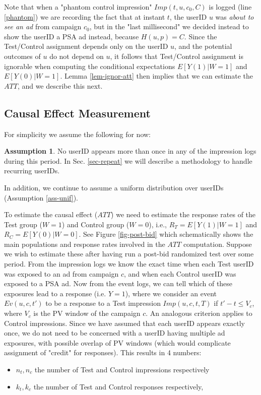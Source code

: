 \documentclass[11pt,a4paper]{article}
\theoremstyle{definition}
\theoremstyle{remark}
\theoremstyle{definition}
\theoremstyle{definition}
\theoremstyle{definition}
\theoremstyle{definition}
\theoremstyle{definition}
\theoremstyle{definition}
\newtheorem{assumption}{Assumption
}[section]
\begin{document}
Note that when a "phantom control impression" $Imp(t, u, c_0, C)$ is logged (line \ref{phantom}) we are recording the fact that at instant $t$, the userID $u$ was {\em about to see an ad} from campaign $c_0$, but in the "last millisecond" we decided instead to show the userID a PSA ad instead, because $H(u,p) = C$. Since the Test/Control assignment depends only on the userID $u$, and the potential outcomes of $u$ do not depend on $u$, it follows that Test/Control assignment is ignorable when computing the conditional expectations $E[Y(1) | W=1]$ and $E[Y(0) | W=1]$. Lemma \ref{lem-ignor-att} then implies that we can estimate the $ATT$, and we describe this next.

\subsection{Causal Effect Measurement}\label{sub-causal-post-bid}

For simplicity we assume the following for now:
\begin{assumption}\small \label{assum-user-once}
	No userID appears more than once in any of the impression logs during this period. In Sec. \ref{sec-repeat} we will describe a methodology to handle recurring userIDs.
\end{assumption}

In addition, we continue to assume a uniform distribution over userIDs (Assumption \ref{ass-unif}).



To estimate the causal effect ($ATT$) we need to estimate the response rates of the Test group ($W=1$) and Control group ($W=0$), i.e., 
$R_T = E[Y(1) | W=1]$ and $R_C = E[Y(0)|W=0]$. 
See Figure \ref{fig-post-bid} which schematically shows the main populations and response rates involved in the $ATT$ computation.
Suppose we wish to estimate these after having run a post-bid randomized test over some period. From the impression logs we know the exact time when each Test userID was exposed to an ad from campaign $c$, and 
when each Control userID was exposed to a PSA ad. Now from the event logs, we can tell which of these exposures lead to a response (i.e. $Y=1$), where we consider an event $Ev(u,c,t')$ to be a response to a Test impression $Imp(u,c,t,T)$ if $t'-t \leq V_c$, where $V_c$ is the PV window of the campaign $c$. An analogous criterion applies to Control impressions. Since we have assumed that each userID appears exactly once, we do not need to be concerned with a userID having multiple ad exposures, with possible overlap of PV windows (which would complicate assignment of "credit" for responses). This results in 4 numbers: 
\begin{itemize}
	\item $n_t, n_c$ the number of Test and Control impressions respectively
	\item $k_t, k_c$ the number of Test and Control responses respectively,
\end{itemize}
\end{document}

